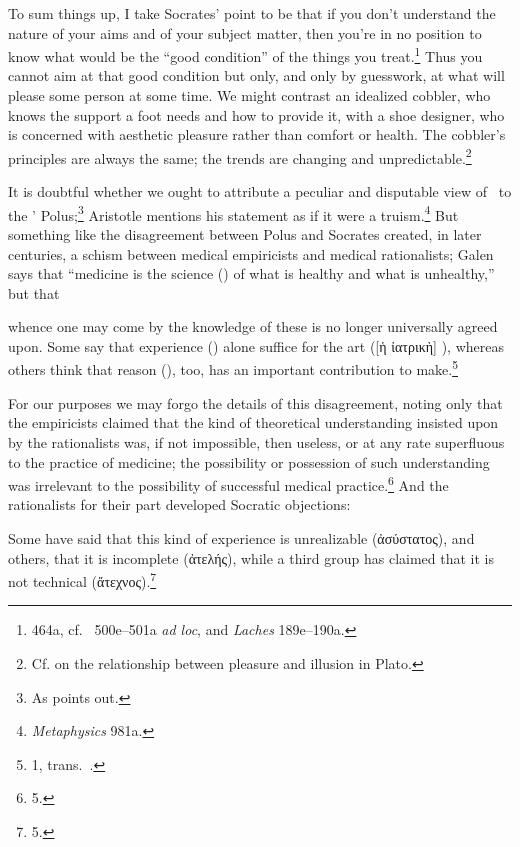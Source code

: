 \documentclass[11pt,letterpaper,oneside]{amsart} %
\begin{document}
To sum things up, I take Socrates' point to be that if you don't understand the nature of your aims and of your subject matter, then you're in no position to know what would be the ``good condition'' of the things you treat.\footnote{464a, cf.\ \citet{irwin1979pg} 500e--501a \emph{ad loc}, and \emph{Laches} 189e--190a.} Thus you cannot aim at that good condition but only, and only by guesswork, at what will please some person at some time. We might contrast an idealized cobbler, who knows the support a foot needs and how to provide it, with a shoe designer, who is concerned with aesthetic pleasure rather than comfort or health. The cobbler's principles are always the same; the trends are changing and unpredictable.\footnote{Cf. \citet{moss2006pai} on the relationship between pleasure and illusion in Plato.}

It is doubtful whether we ought to attribute a peculiar and disputable view of \techne\ to the ' Polus;\footnote{As \citet[pp.\ 346--8]{schiefsky2005} points out.} Aristotle mentions his statement as if it were a truism.\footnote{\emph{Metaphysics} 981a.} But something like the disagreement between Polus and Socrates created, in later centuries, a schism between medical empiricists and medical rationalists; Galen says that ``medicine is the science (\episteme) of what is healthy and what is unhealthy,'' but that\begin{squote}whence one may come by the knowledge of these is no longer universally agreed upon. Some say that experience (\empeiria) alone suffice for the art ([ἡ ἰατρικὴ] \techne), whereas others think that reason (\logos), too, has an important contribution to make.\footnote{ 1, trans.\ .}\end{squote}For our purposes we may forgo the details of this disagreement, noting only that the empiricists claimed that the kind of theoretical understanding insisted upon by the rationalists was, if not impossible, then useless, or at any rate superfluous to the practice of medicine; the possibility or possession of such understanding was irrelevant to the possibility of successful medical practice.\footnote{ 5.} And the rationalists for their part developed Socratic objections: \begin{squote}Some have said that this kind of experience is unrealizable (ἀσύστατος), and others, that it is incomplete (ἀτελής), while a third group has claimed that it is not technical (ἄτεχνος).\footnote{ 5.}\end{squote} 
\end{document}
